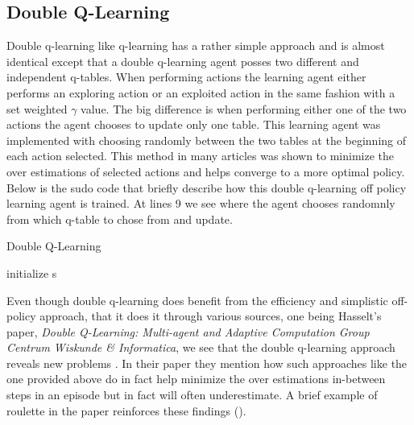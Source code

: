 \documentclass[letterpaper]{article}
\begin{document}
\subsection{Double Q-Learning}

Double q-learning like q-learning has a rather simple approach and is almost identical except that a double q-learning agent posses two different and independent q-tables.  When performing actions the learning agent either performs an exploring action or an exploited action in the same fashion with a set weighted $\gamma$ value.  The big difference is when performing either one of the two actions the agent chooses to update only one table.  This learning agent was implemented with choosing randomly between the two tables at the beginning of each action selected.  This method in many articles was shown to minimize the over estimations of selected actions and helps converge to a more optimal policy. Below is the sudo code that briefly describe how this double q-learning off policy learning agent is trained. At lines 9 we see where the agent chooses randomnly from which q-table to chose from and update.
\begin{algorithm}[tbh]
 \caption{Double Q-Learning}

    initialize s\;
\end{algorithm}
Even though double q-learning does benefit from the efficiency and simplistic off-policy approach, that it does it through various sources, one being Hasselt's paper, \textit{Double Q-Learning: Multi-agent and Adaptive Computation Group Centrum Wiskunde \& Informatica}, we see that the double q-learning approach reveals new problems .  In their paper they mention how such approaches like the one provided above do in fact help minimize the over estimations in-between steps in an episode but in fact will often underestimate.   A brief example of roulette in the paper reinforces these findings (\cite{hasselt2010double}).
\end{document}

